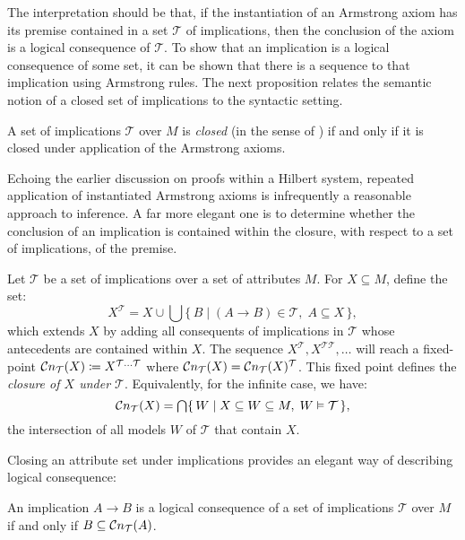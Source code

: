The interpretation should be that, if the instantiation of an Armstrong axiom has
its premise contained in a set $\mathcal{T}$ of implications, then the
conclusion of the axiom is a logical consequence of $\mathcal{T}$. To show that an
implication is a logical consequence of some set, it can be shown that there is
a sequence to that implication using Armstrong rules. The next proposition relates
the semantic notion of a closed set of implications to the syntactic setting.

\begin{proposition}
	\label{proposition:armstrong-closed}

	A set of implications $\mathcal{T}$ over $M$ is \emph{closed} (in the sense of
	) if and only if it is closed under application
	of the Armstrong axioms.
\end{proposition}

Echoing the earlier discussion on proofs within a Hilbert system, repeated application
of instantiated Armstrong axioms is infrequently a reasonable approach to inference.
A far more elegant one is to determine whether the conclusion of an implication
is contained within the closure, with respect to a set of implications, of the
premise.

\begin{definition}
	\label{definition:closure-operator-implications} Let $\mathcal{T}$ be a set of
	implications over a set of attributes $M$. For $X \subseteq M$, define the set:
	\[
		X^{\mathcal{T}}= X \cup \bigcup \{\, B \mid (A \rightarrow B) \in \mathcal{T}
		, \; A \subseteq X \,\},
	\]
	which extends $X$ by adding all consequents of implications in $\mathcal{T}$
	whose antecedents are contained within $X$. The sequence $X^{\mathcal{T}}, X^{\mathcal{T}
				\mathcal{T}}, \ldots$ will reach a fixed-point $\mathcal{C}n_{\mathcal{T}}({X})\coloneqq X
			^{\mathcal{T} \ldots \mathcal{T}}$ where $\mathcal{C}n_{\mathcal{T}}({X})= \mathcal{C}n_{\mathcal{T}}({X})^{\mathcal{T}}$. This fixed point defines the \emph{closure of $X$ under
		$\mathcal{T}$}. Equivalently, for the infinite case, we have:
	\[
		\Cna{\mathcal{T}}{X}= \bigcap \{\, W \mid X \subseteq W \subseteq M, \; W \vDash
		\mathcal{T}\,\},
	\]
	the intersection of all models $W$ of $\mathcal{T}$ that contain $X$.
\end{definition}

Closing an attribute set under implications provides an elegant way of describing
logical consequence:

\begin{proposition}
	\label{proposition:} An implication $A \rightarrow B$ is a logical consequence
	of a set of implications $\mathcal{T}$ over $M$ if and only if $B \subseteq \mathcal{C}n_{\mathcal{T}}({A})$.
\end{proposition}

